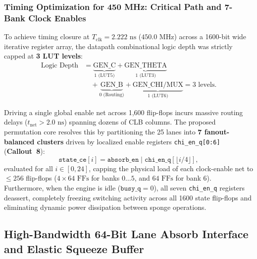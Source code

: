 \subsubsection{Timing Optimization for 450 MHz: Critical Path and 7-Bank Clock Enables}
To achieve timing closure at $T_{\text{clk}} = 2.222\text{ ns}$ ($450.0\text{ MHz}$) across a 1600-bit wide iterative register array, the datapath combinational logic depth was strictly capped at \textbf{3 LUT levels}:
\begin{equation}
\begin{aligned}
\text{Logic Depth} &= \underbrace{\text{GEN\_C}}_{1\text{ (LUT5)}} + \underbrace{\text{GEN\_THETA}}_{1\text{ (LUT3)}} \\
&\quad + \underbrace{\text{GEN\_B}}_{0\text{ (Routing)}} + \underbrace{\text{GEN\_CHI/MUX}}_{1\text{ (LUT6)}} = 3\text{ levels}.
\end{aligned}
\label{eq:lut_depth}
\end{equation}

Driving a single global enable net across 1,600 flip-flops incurs massive routing delays ($t_{\text{net}} > 2.0\text{ ns}$) spanning dozens of CLB columns. The proposed permutation core resolves this by partitioning the 25 lanes into \textbf{7 fanout-balanced clusters} driven by localized enable registers \texttt{chi\_en\_q[0:6]} (\textbf{Callout~8}):
\begin{equation}
\texttt{state\_ce}[i] = \texttt{absorb\_en} \mid \texttt{chi\_en\_q}[\lfloor i / 4 \rfloor],
\label{eq:ce_partition}
\end{equation}
evaluated for all $i \in [0, 24]$, capping the physical load of each clock-enable net to $\le 256$ flip-flops ($4 \times 64\text{ FFs}$ for banks $0 \dots 5$, and $64\text{ FFs}$ for bank 6). Furthermore, when the engine is idle ($\texttt{busy\_q} = 0$), all seven \texttt{chi\_en\_q} registers deassert, completely freezing switching activity across all 1600 state flip-flops and eliminating dynamic power dissipation between sponge operations.

\subsection{High-Bandwidth 64-Bit Lane Absorb Interface and Elastic Squeeze Buffer}
\label{sec:lane_absorb}

